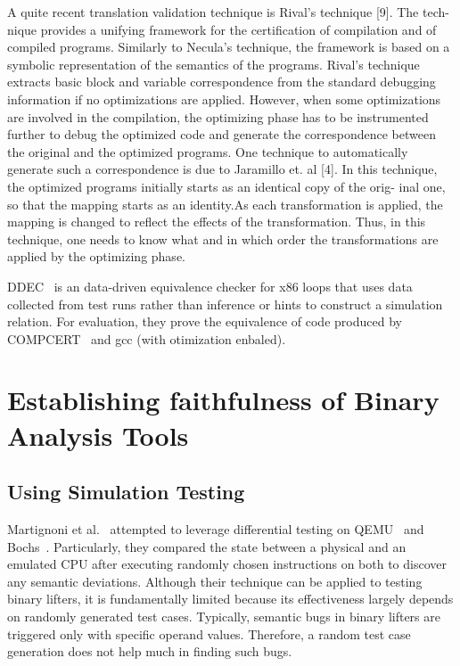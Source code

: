 A quite recent translation validation technique is Rival’s technique [9]. The
tech- nique provides a unifying framework for the certification of compilation
and of compiled programs. Similarly to Necula’s technique, the framework is
based on a symbolic representation of the semantics of the programs. Rival’s
technique extracts basic block and variable correspondence from the standard
debugging information if no optimizations are applied. However, when some
optimizations are involved in the compilation, the optimizing phase has to be
instrumented further to debug the optimized code and generate the
correspondence between the original and the optimized programs. One technique
to automatically generate such a correspondence is due to Jaramillo et. al [4].
In this technique, the optimized programs initially starts as an identical copy
of the orig- inal one, so that the mapping starts as an identity.As each
transformation is applied, the mapping is changed to reflect the effects of the
transformation. Thus, in this technique, one needs to know what and in which
order the transformations are applied by the optimizing phase.  

DDEC~\cite{DDEC:OOPSLA:2013} is an data-driven equivalence checker for x86 loops that uses data
collected from test runs rather than inference or hints to construct a
simulation relation. For evaluation, they prove the equivalence of code produced by \textsc{COMPCERT}~\cite{CompCert:FM06} and gcc (with otimization enbaled).


\section{Establishing faithfulness of Binary Analysis Tools}

\subsection{Using Simulation Testing}

Martignoni et al.~\cite{Martignoni:ISSTA2009, Martignoni:ISSTA2010} attempted
to leverage differential testing on QEMU~\cite{QEMU:USENIX05} and
Bochs~\cite{Bochs1996}. Particularly, they compared the state between a
physical and an emulated CPU after executing randomly chosen instructions on
both to discover any semantic deviations. Although their technique can be
applied to testing binary lifters, it is fundamentally limited because its
effectiveness largely depends on randomly generated test cases. Typically,
              semantic bugs in binary lifters are triggered only with specific
              operand values. Therefore, a random test case generation does not
              help much in finding such bugs.

